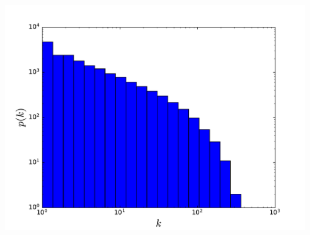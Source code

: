 \documentclass{beamer}
\begin{document}
\begin{frame}
\begin{columns}
        \includegraphics[width=\columnwidth]{deg_distri_global_airport_log_logbins_cumul.pdf}
    \end{columns}
\end{frame}
\end{document}
